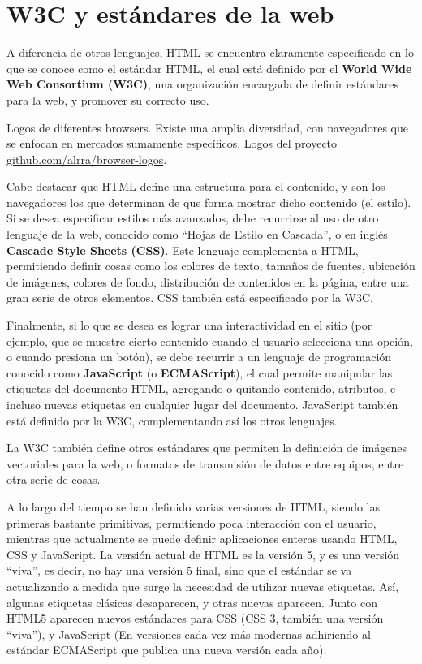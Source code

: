 \section{W3C y estándares de la web}

A diferencia de otros lenguajes, HTML se encuentra claramente especificado en lo
que se conoce como el estándar HTML, el cual está definido por el \textbf{World
Wide Web Consortium (W3C)}, una organización encargada de definir estándares para la web,
y promover su correcto uso.

{Logos de diferentes browsers. Existe una amplia diversidad, con navegadores que
se enfocan en mercados sumamente específicos.}
{Logos del proyecto \href{github.com/alrra/browser-logos}{github.com/alrra/browser-logos}.}

Cabe destacar que HTML define una estructura para el contenido, y son los navegadores
los que determinan de que forma mostrar dicho contenido (el estilo). Si se desea
especificar estilos más avanzados, debe recurrirse al uso de otro lenguaje de la
web, conocido como ``Hojas de Estilo en Cascada'', o en inglés \textbf{Cascade
Style Sheets (CSS)}. Este lenguaje complementa a HTML, permitiendo definir cosas
como los colores de texto, tamaños de fuentes, ubicación de imágenes, colores de
fondo, distribución de contenidos en la página, entre una gran serie de otros
elementos. CSS también está especificado por la W3C.

Finalmente, si lo que se desea es lograr una interactividad en el sitio (por ejemplo,
que se muestre cierto contenido cuando el usuario selecciona una opción, o cuando
presiona un botón), se debe recurrir a un lenguaje de programación conocido como
\textbf{JavaScript} (o \textbf{ECMAScript}), el cual permite manipular las etiquetas
del documento HTML, agregando o quitando contenido, atributos, e incluso nuevas
etiquetas en cualquier lugar del documento. JavaScript también está definido por
la W3C, complementando así los otros lenguajes.

La W3C también define otros estándares que permiten la definición de imágenes
vectoriales para la web, o formatos de transmisión de datos entre equipos, entre
otra serie de cosas.

A lo largo del tiempo se han definido varias versiones de HTML, siendo las primeras
bastante primitivas, permitiendo poca interacción con el usuario, mientras que
actualmente se puede definir aplicaciones enteras usando HTML, CSS y JavaScript.
La versión actual de HTML es la versión 5, y es una versión ``viva'', es decir,
no hay una versión 5 final, sino que el estándar se va actualizando a medida que
surge la necesidad de utilizar nuevas etiquetas. Así, algunas etiquetas clásicas
desaparecen, y otras nuevas aparecen. Junto con HTML5 aparecen nuevos estándares
para CSS (CSS 3, también una versión ``viva''), y JavaScript (En versiones cada
vez más modernas adhiriendo al estándar ECMAScript que publica una nueva versión
cada año).


